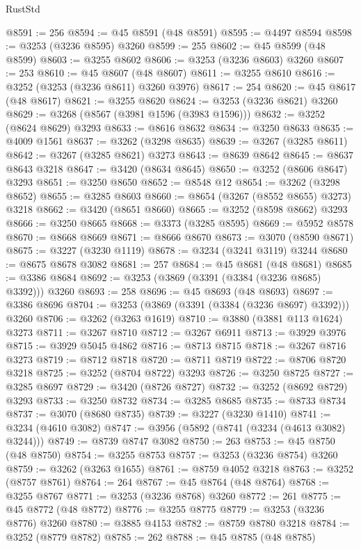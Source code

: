 \begin{lexlean}{RustStd}
\begin{coremodule}
{\begin{coremodule}
{{{{{{{{{{{{{{{{{{{{{{{{{{{{{{{{{{{{{{{@8591 := 256
@8594 := @45 @8591 (@48 @8591)
@8595 := @4497 @8594
@8598 := @3253 (@3236 @8595) @3260
@8599 := 255
@8602 := @45 @8599 (@48 @8599)
@8603 := @3255 @8602
@8606 := @3253 (@3236 @8603) @3260
@8607 := 253
@8610 := @45 @8607 (@48 @8607)
@8611 := @3255 @8610
@8616 := @3252 (@3253 (@3236 @8611) @3260 @3976)
@8617 := 254
@8620 := @45 @8617 (@48 @8617)
@8621 := @3255 @8620
@8624 := @3253 (@3236 @8621) @3260
@8629 := @3268 (@8567 (@3981 @1596 (@3983 @1596)))
@8632 := @3252 (@8624 @8629) @3293
@8633 := @8616 @8632
@8634 := @3250 @8633
@8635 := @4009 @1561
@8637 := @3262 (@3298 @8635)
@8639 := @3267 (@3285 @8611)
@8642 := @3267 (@3285 @8621) @3273
@8643 := @8639 @8642
@8645 := @8637 @8643 @3218
@8647 := @3420 (@8634 @8645)
@8650 := @3252 (@8606 @8647) @3293
@8651 := @3250 @8650
@8652 := @8548 @12
@8654 := @3262 (@3298 @8652)
@8655 := @3285 @8603
@8660 := @8654 (@3267 (@8552 @8655) @3273) @3218
@8662 := @3420 (@8651 @8660)
@8665 := @3252 (@8598 @8662) @3293
@8666 := @3250 @8665
@8668 := @3373 (@3285 @8595)
@8669 := @5952 @8578
@8670 := @8668 @8669
@8671 := @8666 @8670
@8673 := @3070 (@8590 @8671)
@8675 := @3227 (@3230 @1119)
@8678 := @3234 (@3241 @3119) @3244
@8680 := @8675 @8678 @3082
@8681 := 257
@8684 := @45 @8681 (@48 @8681)
@8685 := @3386 @8684
@8692 := @3253 (@3869 (@3391 (@3384 (@3236 @8685) @3392))) @3260
@8693 := 258
@8696 := @45 @8693 (@48 @8693)
@8697 := @3386 @8696
@8704 := @3253 (@3869 (@3391 (@3384 (@3236 @8697) @3392))) @3260
@8706 := @3262 (@3263 @1619)
@8710 := @3880 (@3881 @113 @1624) @3273
@8711 := @3267 @8710
@8712 := @3267 @6911
@8713 := @3929 @3976
@8715 := @3929 @5045 @4862
@8716 := @8713 @8715
@8718 := @3267 @8716 @3273
@8719 := @8712 @8718
@8720 := @8711 @8719
@8722 := @8706 @8720 @3218
@8725 := @3252 (@8704 @8722) @3293
@8726 := @3250 @8725
@8727 := @3285 @8697
@8729 := @3420 (@8726 @8727)
@8732 := @3252 (@8692 @8729) @3293
@8733 := @3250 @8732
@8734 := @3285 @8685
@8735 := @8733 @8734
@8737 := @3070 (@8680 @8735)
@8739 := @3227 (@3230 @1410)
@8741 := @3234 (@4610 @3082)
@8747 := @3956 (@5892 (@8741 (@3234 (@4613 @3082) @3244)))
@8749 := @8739 @8747 @3082
@8750 := 263
@8753 := @45 @8750 (@48 @8750)
@8754 := @3255 @8753
@8757 := @3253 (@3236 @8754) @3260
@8759 := @3262 (@3263 @1655)
@8761 := @8759 @4052 @3218
@8763 := @3252 (@8757 @8761)
@8764 := 264
@8767 := @45 @8764 (@48 @8764)
@8768 := @3255 @8767
@8771 := @3253 (@3236 @8768) @3260
@8772 := 261
@8775 := @45 @8772 (@48 @8772)
@8776 := @3255 @8775
@8779 := @3253 (@3236 @8776) @3260
@8780 := @3885 @4153
@8782 := @8759 @8780 @3218
@8784 := @3252 (@8779 @8782)
@8785 := 262
@8788 := @45 @8785 (@48 @8785)
}}}}}}}}}}}}}}}}}}}}}}}}}}}}}}}}}}}}}}}
\end{coremodule}}
\end{coremodule}
\end{lexlean}
